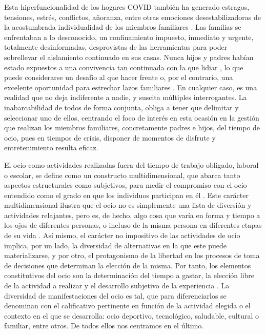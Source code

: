 \documentclass{textolivre}
\begin{document}
Esta hiperfuncionalidad de los hogares COVID también ha generado estragos, tensiones, estrés, conflictos, añoranza, entre otras emociones desestabilizadoras de la acostumbrada individualidad de los miembros familiares \cite{belmonte2020, molina2020, robinet-serrano2020}. Las familias se enfrentaban a lo desconocido, un confinamiento impuesto, inmediato y urgente, totalmente desinformadas, desprovistas de las herramientas para poder sobrellevar el aislamiento continuado en sus casas. Nunca hijos y padres habían estado expuestos a una convivencia tan continuada con la que lidiar \cite{pedreira2020}, lo que puede considerarse un desafío al que hacer frente o, por el contrario, una excelente oportunidad para estrechar lazos familiares \cite{vestettekal2020}. En cualquier caso, es una realidad que no deja indiferente a nadie, y suscita múltiples interrogantes. La inabarcabilidad de todos de forma conjunta, obliga a tener que delimitar y seleccionar uno de ellos, centrando el foco de interés en esta ocasión en la gestión que realizan los miembros familiares, concretamente padres e hijos, del tiempo de ocio, pues en tiempos de crisis, disponer de momentos de disfrute y entretenimiento resulta eficaz.

El ocio como actividades realizadas fuera del tiempo de trabajo obligado, laboral o escolar, se define como un constructo multidimensional, que abarca tanto aspectos estructurales como subjetivos, para medir el compromiso con el ocio entendido como el grado en que los individuos participan en él \cite{newman2014}. Este carácter multidimensional ilustra que el ocio no es simplemente una lista de diversión y actividades relajantes, pero es, de hecho, algo cosa que varía en forma y tiempo a los ojos de diferentes personas, o incluso de la misma persona en diferentes etapas de su vida \cite{chen2018}. Así mismo, el carácter no impositivo de las actividades de ocio implica, por un lado, la diversidad de alternativas en la que este puede materializarse, y por otro, el protagonismo de la libertad en los procesos de toma de decisiones que determinan la elección de la misma. Por tanto, los elementos constitutivos del ocio son la determinación del tiempo a gastar, la elección libre de la actividad a realizar y el desarrollo subjetivo de la experiencia \cite{alvarez2020, kelly2012}. La diversidad de manifestaciones del ocio es tal, que para diferenciarlos se denominan con el calificativo pertinente en función de la actividad elegida o el contexto en el que se desarrolla: ocio deportivo, tecnológico, saludable, cultural o familiar, entre otros. De todos ellos nos centramos en el último. 
\end{document}
